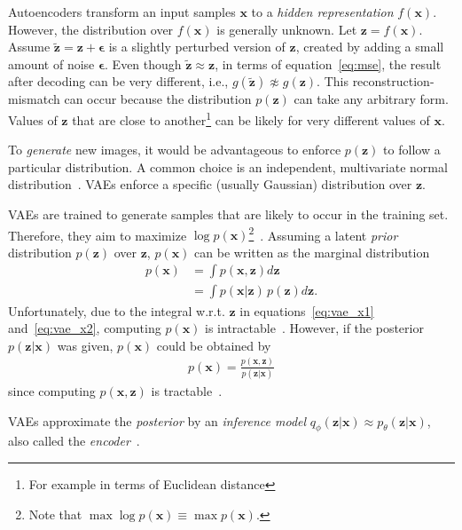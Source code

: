 Autoencoders transform an input samples $\bm{x}$ to a \textit{hidden representation} $f(\bm{x})$.
However, the distribution over $f(\bm{x})$ is generally unknown.
Let $\bm{z} = f(\bm{x})$.
Assume $\bm{\tilde{z}} = \bm{z} + \bm{\epsilon}$ is a slightly perturbed version of $\bm{z}$, created by adding a small amount of noise $\bm{\epsilon}$.
Even though $\bm{\tilde{z}} \approx \bm{z}$, in terms of equation~\ref{eq:mse}, the result after decoding can be very different, i.e., $g(\bm{\tilde{z}}) \not\approx g(\bm{z})$.
This reconstruction-mismatch can occur because the distribution $p(\bm{z})$ can take any arbitrary form.
Values of $\bm{z}$ that are close to another\footnote{For example in terms of Euclidean distance} can be likely for very different values of $\bm{x}$.

To \textit{generate} new images, it would be advantageous to enforce $p(\bm{z})$ to follow a particular distribution.
A common choice is an independent, multivariate normal distribution~\citep[pp. 24, 25]{kingma2019introduction}.
\acp{VAE} enforce a specific (usually Gaussian) distribution over $\bm{z}$.

\acp{VAE} are trained to generate samples that are likely to occur in the training set.
Therefore, they aim to maximize $\log p(\bm{x})$\footnote{Note that $\max \log  p(\bm{x}) \equiv \max  p(\bm{x})$.}~\citep[p. 18]{kingma2019introduction}.
Assuming a latent \textit{prior} distribution $p(\bm{z})$ over $\bm{z}$, $p(\bm{x})$ can be written as the marginal distribution
\begin{align}
    p(\bm{x}) &= \int p(\bm{x}, \bm{z})d\bm{z} \label{eq:vae_x1}\\
    &= \int p(\bm{x}|\bm{z})\,p(\bm{z})d\bm{z}. \label{eq:vae_x2}
\end{align}
Unfortunately, due to the integral w.r.t. $\bm{z}$ in equations~\ref{eq:vae_x1} and~\ref{eq:vae_x2}, computing $p(\bm{x})$ is intractable~\citep[p. 13]{kingma2019introduction}.
However, if the posterior $p(\bm{z}|\bm{x})$ was given, $p(\bm{x})$ could be obtained by
\begin{align}
    p(\bm{x}) = \frac{p(\bm{x}, \bm{z})}{p(\bm{z}|\bm{x})}
\end{align}
since computing $p(\bm{x}, \bm{z})$ is tractable~\citep[p. 14]{kingma2019introduction}.

\acp{VAE} approximate the \textit{posterior} by an \textit{inference model} $q_\phi(\bm{z}|\bm{x}) \approx p_\theta(\bm{z}|\bm{x})$, also called the \textit{encoder}~\citep[p. 15]{kingma2019introduction}.

